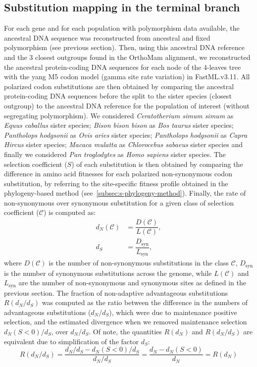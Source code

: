 \documentclass{article}
\newcommand{\dn}{d_N}
\newcommand{\ds}{d_S}
\newcommand{\dnds}{\dn / \ds}
\newcommand{\Sphy}{S}
\newcommand{\Sphyclass}{\mathcal{C}}
\begin{document}
    \subsection*{Substitution mapping in the terminal branch}
    \label{subsec:substitution-mapping-in-the-terminal-branch}
    For each gene and for each population with polymorphism data available, the ancestral DNA sequence was reconstructed from ancestral and fixed polymorphism (see previous section).
    Then, using this ancestral DNA reference and the $3$ closest outgroups found in the OrthoMam alignment, we reconstructed the ancestral protein-coding DNA sequences for each node of the 4-leaves tree with the yang M5 codon model (gamma site rate variation) in FastML.v3.11\cite{ashkenazy_fastml_2012}.
    All polarized codon substitutions are then obtained by comparing the ancestral protein-coding DNA sequences before the split to the sister species (closest outgroup) to the ancestral DNA reference for the population of interest (without segregating polymorphism).
    We considered \textit{Ceratotherium simum simum} as \textit{Equus caballus} sister species; \textit{Bison bison bison} as \textit{Bos taurus} sister species; \textit{Pantholops hodgsonii} as \textit{Ovis aries} sister species; \textit{Pantholops hodgsonii} as \textit{Capra Hircus} sister species; \textit{Macaca mulatta} as \textit{Chlorocebus sabaeus} sister species and finally we considered \textit{Pan troglodytes} as \textit{Homo sapiens} sister species.
    The selection coefficient ($\Sphy$) of each substitution is then obtained by comparing the difference in amino acid fitnesses for each polarized non-synonymous codon substitution, by referring to the site-specific fitness profile obtained in the phylogeny-based method (see~\ref{subsec:s-phylogeny-method}).
    Finally, the rate of non-synonymous over synonymous substitution for a given class of selection coefficient ($\Sphyclass$) is computed as:
    \begin{align}
        \dn \left( \Sphyclass \right) &= \dfrac{D\left( \Sphyclass \right)}{L \left( \Sphyclass \right)}, \\
        \ds &= \dfrac{D_{\textrm{syn}}}{L_{\textrm{syn}}},
    \end{align}
    where $D \left( \Sphyclass \right) $ is the number of non-synonymous substitutions in the class $\Sphyclass$, $D_{\textrm{syn}}$ is the number of synonymous substitutions across the genome, while $L \left( \Sphyclass \right)$ and $L_{\textrm{syn}}$ are the number of non-synonymous and synonymous sites as defined in the previous section.
    The fraction of non-adaptive advantageous substitutions $R(\dnds)$ was computed as the ratio between the difference in the numbers of advantageous substitutions ($\dnds$), which were due to maintenance positive selection, and the estimated divergence when we removed maintenance selection $\dn (\Sphy < 0) / \ds$, over $\dnds$.
    Of note, the quantities $R(\dn)$ and $R(\dnds)$ are equivalent due to simplification of the factor $\ds$:
    \begin{equation}
        R(\dnds) = \dfrac{\dnds - \dn(\Sphy < 0) / \ds}{\dnds} = \dfrac{\dn - \dn(\Sphy < 0)}{\dn} = R(\dn)
    \end{equation}

    \printbibliography
\end{document}
